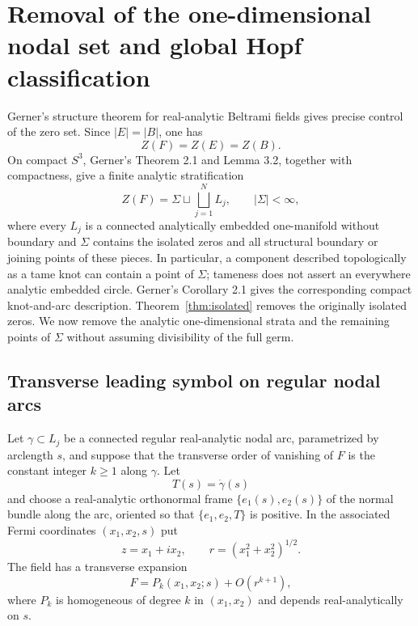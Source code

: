 \documentclass[aps,prd,reprint,nofootinbib,superscriptaddress]{revtex4-2}
\theoremstyle{definition}
\theoremstyle{remark}
\begin{document}
\section{Removal of the one-dimensional nodal set and global Hopf classification}
\label{sec:globalremoval}

Gerner's structure theorem for real-analytic Beltrami fields \cite{Gerner2021} gives precise control of the zero set. Since $|E|=|B|$, one has
\begin{equation}
Z(F)=Z(E)=Z(B).
\label{eq:zerosame}
\end{equation}
On compact $S^3$, Gerner's Theorem 2.1 and Lemma 3.2, together with compactness, give a finite analytic stratification
\begin{equation}
Z(F)=\Sigma\sqcup\bigsqcup_{j=1}^{N}L_j,
\qquad |\Sigma|<\infty,
\label{eq:Gernerdecomp}
\end{equation}
where every $L_j$ is a connected analytically embedded one-manifold without boundary and $\Sigma$ contains the isolated zeros and all structural boundary or joining points of these pieces. In particular, a component described topologically as a tame knot can contain a point of $\Sigma$; tameness does not assert an everywhere analytic embedded circle. Gerner's Corollary 2.1 gives the corresponding compact knot-and-arc description. Theorem~\ref{thm:isolated} removes the originally isolated zeros. We now remove the analytic one-dimensional strata and the remaining points of $\Sigma$ without assuming divisibility of the full germ.

\subsection{Transverse leading symbol on regular nodal arcs}
\label{subsec:transverse}

Let $\gamma\subset L_j$ be a connected regular real-analytic nodal arc, parametrized by arclength $s$, and suppose that the transverse order of vanishing of $F$ is the constant integer $k\ge1$ along $\gamma$. Let
\[
T(s)=\dot\gamma(s)
\]
and choose a real-analytic orthonormal frame $\{e_1(s),e_2(s)\}$ of the normal bundle along the arc, oriented so that $\{e_1,e_2,T\}$ is positive. In the associated Fermi coordinates $(x_1,x_2,s)$ put
\[
z=x_1+ix_2,
\qquad r=(x_1^2+x_2^2)^{1/2}.
\]
The field has a transverse expansion
\begin{equation}
F=P_k(x_1,x_2;s)+O(r^{k+1}),
\label{eq:transverseexpansion}
\end{equation}
where $P_k$ is homogeneous of degree $k$ in $(x_1,x_2)$ and depends real-analytically on $s$.
\end{document}
